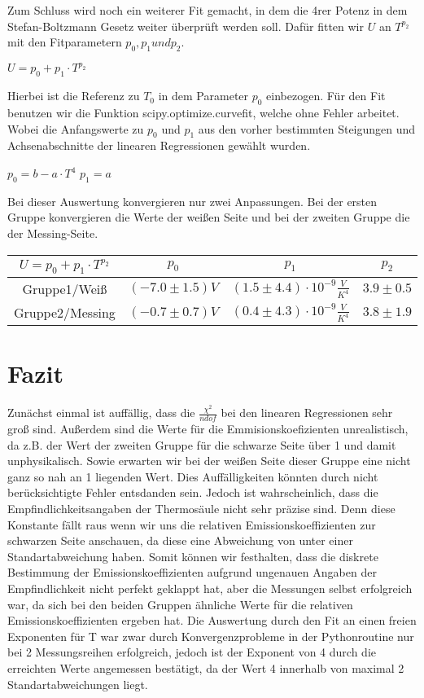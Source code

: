 \documentclass[a4paper, 11pt]{article}
\begin{document}
Zum Schluss wird noch ein weiterer Fit gemacht, in dem die 4rer Potenz in dem Stefan-Boltzmann Gesetz weiter überprüft werden soll.
Dafür fitten wir $U$ an $T^{p_2}$ mit den Fitparametern $p_0,p_1 und p_2$.
\begin{center}
$ U=p_0+p_1\cdot T^{p_2}$
\end{center}
Hierbei ist die Referenz zu $T_0$ in dem Parameter $p_0$ einbezogen.
Für den Fit benutzen wir die Funktion scipy.optimize.curvefit, welche ohne Fehler arbeitet.
Wobei die Anfangswerte zu $p_0$ und $p_1$ aus den vorher bestimmten Steigungen und Achsenabschnitte der linearen Regressionen gewählt wurden.
\begin{center}
$p_0=b-a\cdot T^4$ \;\;\;\;\;\;\; $p_1=a$
\end{center}

Bei dieser Auswertung konvergieren nur zwei Anpassungen. Bei der ersten Gruppe konvergieren die Werte der weißen Seite und bei der zweiten Gruppe die der Messing-Seite.
\begin{center}
\begin{tabular}{|c|c|c|c|}
\hline $ U=p_0+p_1\cdot T^{p_2}$& $p_0$& $p_1$ & $p_2$\\
\hline Gruppe1/Weiß & $(-7.0 \pm 1.5)V $ & $ (1.5 \pm 4.4  )\cdot 10^{-9}\frac{V}{K^4}$  & $ 3.9\pm 0.5 $ \\
\hline Gruppe2/Messing &  $(-0.7 \pm 0.7)V $ & $ (0.4 \pm 4.3  )\cdot 10^{-9}\frac{V}{K^4}$  & $ 3.8\pm 1.9 $  \\
\hline
\end{tabular}
\end{center}

\section{Fazit}
Zunächst einmal ist auffällig, dass die $\frac{\chi^2}{ndof}$ bei den linearen Regressionen sehr groß sind. Außerdem sind die Werte für die Emmisionskoefizienten unrealistisch, da z.B. der Wert der zweiten Gruppe für die schwarze Seite über 1 und damit unphysikalisch. Sowie erwarten wir bei der weißen Seite dieser Gruppe eine nicht ganz so nah an 1 liegenden Wert.
Dies Auffälligkeiten könnten durch nicht berücksichtigte Fehler entsdanden sein. Jedoch ist wahrscheinlich, dass die Empfindlichkeitsangaben der Thermosäule nicht sehr präzise sind. Denn diese Konstante fällt raus wenn wir uns die relativen Emissionskoeffizienten zur schwarzen Seite anschauen, da diese eine Abweichung von unter einer Standartabweichung haben.
Somit können wir festhalten, dass die diskrete Bestimmung der Emissionskoeffizienten aufgrund ungenauen Angaben der Empfindlichkeit nicht perfekt geklappt hat, aber die Messungen selbst erfolgreich war, da sich bei den beiden Gruppen ähnliche Werte für die relativen Emissionskoeffizienten ergeben hat.
Die Auswertung durch den Fit an einen freien Exponenten für T war zwar durch Konvergenzprobleme in der Pythonroutine nur bei 2 Messungsreihen erfolgreich, jedoch ist der Exponent von 4 durch die erreichten Werte angemessen bestätigt, da der Wert 4 innerhalb von maximal 2 Standartabweichungen liegt.
\end{document}
